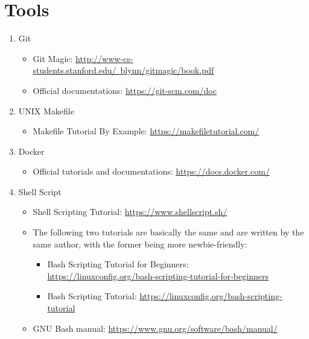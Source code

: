 \documentclass{article}
\begin{document}
\section{Tools}
\begin{enumerate}
    \item Git
    \begin{itemize}
        \item Git Magic:
        \href{http://www-cs-students.stanford.edu/~blynn/gitmagic/book.pdf}{http://www-cs-students.stanford.edu/~blynn/gitmagic/book.pdf}
        \item Official documentations:
        \href{https://git-scm.com/doc}{https://git-scm.com/doc}
    \end{itemize}
    \item UNIX Makefile
    \begin{itemize}
        \item Makefile Tutorial By Example:
        \href{https://makefiletutorial.com/}{https://makefiletutorial.com/}
    \end{itemize}
    \item Docker
    \begin{itemize}
        \item Official tutorials and documentations:
        \href{https://docs.docker.com/}{https://docs.docker.com/}
    \end{itemize}
    \item Shell Script
    \begin{itemize}
        \item Shell Scripting Tutorial:
        \href{https://www.shellscript.sh/}{https://www.shellscript.sh/}
        \item The following two tutorials are basically the same and are written by the same author, with the former being more newbie-friendly:
        \begin{itemize}
            \item Bash Scripting Tutorial for Beginners:\\ \href{https://linuxconfig.org/bash-scripting-tutorial-for-beginners}{https://linuxconfig.org/bash-scripting-tutorial-for-beginners}
            \item Bash Scripting Tutorial: \href{https://linuxconfig.org/bash-scripting-tutorial}{https://linuxconfig.org/bash-scripting-tutorial}
        \end{itemize}
        \item GNU Bash manual: \href{https://www.gnu.org/software/bash/manual/}{https://www.gnu.org/software/bash/manual/}
    \end{itemize}
\end{enumerate}
\end{document}
